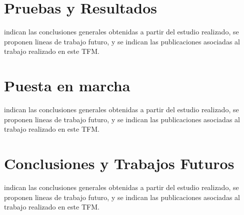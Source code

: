 \documentclass[a4paper, 12pt]{book}
\renewcommand{\thesection}{\arabic{section}}
\renewcommand{\thesubsection}{\thesection . \arabic{subsection} }
\begin{document}


\renewcommand{\thesection}{\thechapter.\arabic{section}}
\renewcommand{\thesubsection}{\thesection.\arabic{subsection}}






\cleardoublepage
\chapter{Pruebas y Resultados}
\label{chap:resultados}
indican las conclusiones generales obtenidas a partir del estudio realizado, se proponen lineas de trabajo futuro, y se indican las publicaciones asociadas al trabajo realizado en este TFM.


\cleardoublepage
\chapter{Puesta en marcha}
\label{chap:puestaEnMarcha}
indican las conclusiones generales obtenidas a partir del estudio realizado, se proponen lineas de trabajo futuro, y se indican las publicaciones asociadas al trabajo realizado en este TFM.


\cleardoublepage
\chapter{Conclusiones y Trabajos Futuros}
\label{chap:conclusiones}
indican las conclusiones generales obtenidas a partir del estudio realizado, se proponen lineas de trabajo futuro, y se indican las publicaciones asociadas al trabajo realizado en este TFM.


\cleardoublepage


\end{document}
